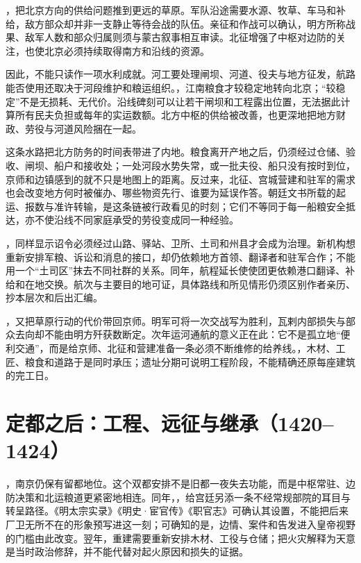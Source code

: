 ，把北京方向的供给问题推到更远的草原。军队沿途需要水源、牧草、车马和补给，敌方部众却并非一支静止等待会战的队伍。亲征和作战可以确认，明方所称战果、敌军人数和部众归属则须与蒙古叙事相互审读。北征增强了中枢对边防的关注，也使北京必须持续取得南方和沿线的资源。

因此，不能只读作一项水利成就。河工要处理闸坝、河道、役夫与地方征发，航路能否使用还取决于河段维护和粮运组织。，江南粮食才较稳定地转向北京；“较稳定”不是无损耗、无代价。沿线碑刻可以让若干闸坝和工程露出位置，无法据此计算所有民夫负担或每年的实运数额。北方中枢的供给被改善，也更深地把地方财政、劳役与河道风险捆在一起。

这条水路把北方防务的时间表带进了内地。粮食离开产地之后，仍须经过仓储、验收、闸坝、船户和接收处；一处河段水势失常，或一批夫役、船只没有按时到位，京师和边镇感到的就不只是地图上的距离。反过来，北征、宫城营建和驻军的需求也会改变地方何时被催办、哪些物资先行、谁要为延误作答。朝廷文书所载的起运、报数与准许转输，是这条链被行政看见的时刻；它们不等同于每一船粮安全抵达，亦不使沿线不同家庭承受的劳役变成同一种经验。

，同样显示诏令必须经过山路、驿站、卫所、土司和州县才会成为治理。新机构想重新安排军粮、诉讼和消息的接口，却仍依赖地方首领、翻译者和驻军合作；不能用一个“土司区”抹去不同社群的关系。同年，航程延长使使团更依赖港口翻译、补给和在地交换。航次与主要目的地可证，具体路线和所见情形仍须区别作者亲历、抄本层次和后出汇编。

，又把草原行动的代价带回京师。明军可将一次交战写为胜利，瓦剌内部损失与部众去向却不能由明方歼获数断定。次年运河通航的意义正在此：它不是孤立地“便利交通”，而是给京师、北征和营建准备一条必须不断维修的给养线。，木材、工匠、粮食和道路于是同时承压；遗址分期可说明工程阶段，不能精确还原每座建筑的完工日。

\section{定都之后：工程、远征与继承（1420--1424）}

，南京仍保有留都地位。这个双都安排不是旧都一夜失去功能，而是中枢常驻、边防决策和北运粮道更紧密地相连。同年，，给宫廷另添一条不经常规部院的耳目与转呈路径。《明太宗实录》《明史·宦官传》《职官志》可确认其设置，不能把后来厂卫无所不在的形象预写进这一刻；可确知的是，边情、案件和告发进入皇帝视野的门槛由此改变。翌年，重建需要重新安排木材、工役与仓储；把火灾解释为天意是当时政治修辞，并不能代替对起火原因和损失的证据。

